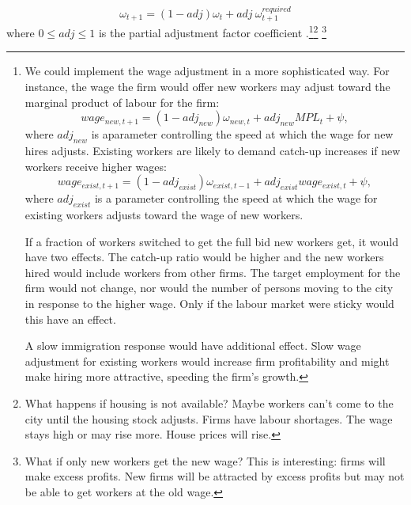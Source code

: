 \begin{equation}
\omega_{t+1}= (1-adj)\omega_{t} + adj\ \omega^{required}_{t+1}
\end{equation}
where $0\le adj \le 1$ is the partial adjustment factor coefficient
.\footnote{We could implement the wage adjustment in a more sophisticated way. For instance, the wage the firm would offer new workers may adjust toward the marginal product of labour for the firm: %
\begin{equation}wage_{new,t+1}= (1-adj_{new})\omega_{new,t} + adj_{new} MPL_{t}  +\psi, \end{equation}
where $adj_{new}$ is aparameter controlling the speed at which the wage for new hires adjusts. 
Existing workers are likely to demand catch-up increases if new workers receive higher wages:
\begin{equation} wage_{exist,t+1}= (1-adj_{exist}) \omega_{exist, t-1} + adj_{exist} wage_{exist,t}  +\psi, \end{equation}
where $adj_{exist}$ is a parameter controlling the speed at which the wage for existing workers adjusts toward the wage of new workers.

If a fraction of workers switched to get the full bid new workers get, it would have two effects. The catch-up ratio would be higher and the new workers hired would include workers from other firms. The target employment for the firm would not change, nor would the number of persons moving to the city in response to the higher wage. Only if the labour market were sticky would this have an effect.

A slow immigration response would have additional effect.
Slow wage adjustment for existing workers would increase firm profitability and might make hiring more attractive, speeding the firm's growth.}\footnote{What happens if housing is not available? Maybe workers can't come to the city until the housing stock adjusts. Firms have labour shortages.  The wage stays high or may rise more. House prices will rise.} \footnote{What if only new workers get the new wage? This is interesting: firms will make excess profits. New firms will be attracted by excess profits but may not be able to get workers at the old wage.}



